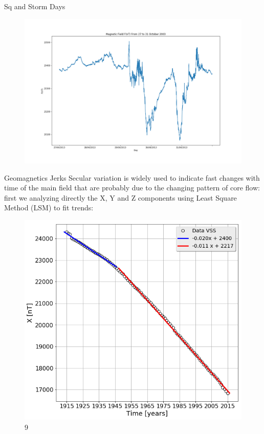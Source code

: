 \documentclass[final,t]{beamer}
\begin{document}
\begin{columns}[t]
\begin{column}{.25\linewidth}
\begin{block}{Sq and Storm Days}
	\begin{figure}
		\centering
		\includegraphics[width=0.9\linewidth]{F27_31_october(2003)}
		\label{fig:F27_31_october(2003)}
	\end{figure}
	
	
\end{block}	

	\begin{block}{Geomagnetics Jerks}
		\justifying
		Secular variation is widely used to indicate fast changes with time of the main field that are probably due to the changing pattern of core flow:
		first we analyzing directly the X, Y and Z components using Least Square Method (LSM) to fit trends: 	
		
		\begin{figure}
			\centering
			\includegraphics[scale=0.8]{"figs_ed/Linear regression X_v3"}
			\caption{9}
			\label{fig:LinearregressionX_v2}
		\end{figure}
		

\end{block}
\end{column}
\end{columns}
\end{document}
